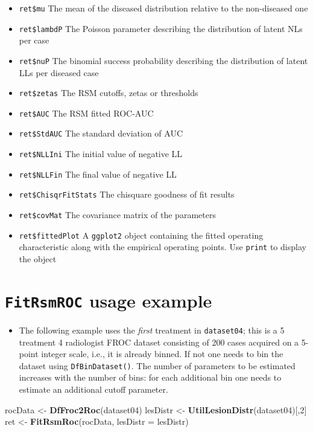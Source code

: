 \documentclass[
]{book}
\newenvironment{Shaded}{\begin{snugshade}}{\end{snugshade}}
\newcommand{\DataTypeTok}[1]{\textcolor[rgb]{0.13,0.29,0.53}{#1}}
\newcommand{\DecValTok}[1]{\textcolor[rgb]{0.00,0.00,0.81}{#1}}
\newcommand{\KeywordTok}[1]{\textcolor[rgb]{0.13,0.29,0.53}{\textbf{#1}}}
\newcommand{\NormalTok}[1]{#1}
\newcommand{\StringTok}[1]{\textcolor[rgb]{0.31,0.60,0.02}{#1}}
\providecommand{\tightlist}{%
  \setlength{\itemsep}{0pt}\setlength{\parskip}{0pt}}
\begin{document}
\begin{itemize}
\item
  \texttt{ret\$mu} The mean of the diseased distribution relative to the non-diseased one
\item
  \texttt{ret\$lambdP} The Poisson parameter describing the distribution of latent NLs per case
\item
  \texttt{ret\$nuP} The binomial success probability describing the distribution of latent LLs per diseased case
\item
  \texttt{ret\$zetas} The RSM cutoffs, zetas or thresholds
\item
  \texttt{ret\$AUC} The RSM fitted ROC-AUC
\item
  \texttt{ret\$StdAUC} The standard deviation of AUC
\item
  \texttt{ret\$NLLIni} The initial value of negative LL
\item
  \texttt{ret\$NLLFin} The final value of negative LL
\item
  \texttt{ret\$ChisqrFitStats} The chisquare goodness of fit results
\item
  \texttt{ret\$covMat} The covariance matrix of the parameters
\item
  \texttt{ret\$fittedPlot} A \texttt{ggplot2} object containing the fitted operating characteristic along with the empirical operating points. Use \texttt{print} to display the object
\end{itemize}

\hypertarget{rsm-fitting-fitrsmroc-usage-example}{%
\section{\texorpdfstring{\texttt{FitRsmROC} usage example}{FitRsmROC usage example}}\label{rsm-fitting-fitrsmroc-usage-example}}

\begin{itemize}
\tightlist
\item
  The following example uses the \emph{first} treatment in \texttt{dataset04}; this is a 5 treatment 4 radiologist FROC dataset \citep{zanca2009evaluation} consisting of 200 cases acquired on a 5-point integer scale, i.e., it is already binned. If not one needs to bin the dataset using \texttt{DfBinDataset()}. The number of parameters to be estimated increases with the number of bins: for each additional bin one needs to estimate an additional cutoff parameter.
\end{itemize}

\begin{Shaded}
\begin{Highlighting}[]
\NormalTok{rocData <-}\StringTok{ }\KeywordTok{DfFroc2Roc}\NormalTok{(dataset04)}
\NormalTok{lesDistr <-}\StringTok{ }\KeywordTok{UtilLesionDistr}\NormalTok{(dataset04)[,}\DecValTok{2}\NormalTok{]}
\NormalTok{ret <-}\StringTok{ }\KeywordTok{FitRsmRoc}\NormalTok{(rocData, }\DataTypeTok{lesDistr =}\NormalTok{ lesDistr)}
\end{Highlighting}
\end{Shaded}
\end{document}
